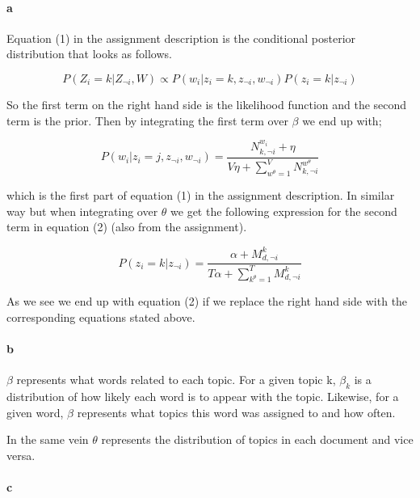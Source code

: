 \documentclass{article}
\begin{document}
\paragraph{a}

Equation (1) in the assignment description is the conditional posterior
distribution that looks as follows.

\begin{equation*}
P(Z_i = k \vert Z_{\neg i}, W) \propto P(w_i \vert z_i = k, z_{\neg i}, w_{\neg i})P(z_i = k \vert z_{\neg i })
\end{equation*}

So the first term on the right hand side is the likelihood function and the
second term is the prior. Then by integrating the first term over $\beta$ we
end up with;

\begin{equation*}
P(w_i \vert z_i = j, z_{\neg i}, w_{\neg i}) = \frac{ N^{w_i}_{k,\neg i} + \eta }{V\eta + \sum_{w^{\theta}=1}^V N^{w^\theta}_{k, \neg i}}
\end{equation*}

which is the first part of equation (1) in the assignment description. In
similar way but when integrating over $\theta$ we get the following expression
for the second term in equation (2) (also from the assignment).

\begin{equation*}
P(z_i = k \vert z_{\neg i}) = \frac{\alpha + M^{k}_{d,\neg i}}{T\alpha + \sum_{k^\theta=1}^T M^k_{d, \neg i} }
\end{equation*}

As we see we end up with equation (2) if we replace the right hand side with
the corresponding equations stated above.

\paragraph{b}

$\beta$ represents what words related to each topic. For a given topic k,
$\beta_k$ is a distribution of how likely each word is to appear with the
topic. Likewise, for a given word, $\beta$ represents what topics this word was
assigned to and how often.

In the same vein $\theta$ represents the distribution of topics in each
document and vice versa.

\paragraph{c}
\end{document}
